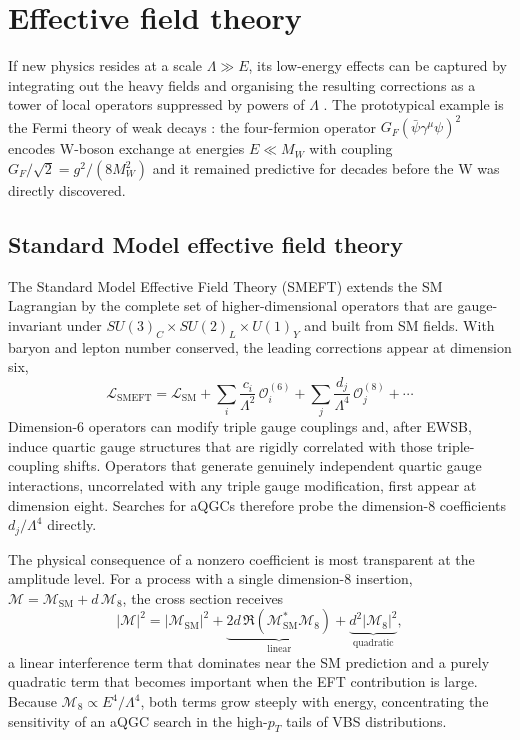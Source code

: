 \section{Effective field theory}

If new physics resides at a scale $\Lambda \gg E$, its low-energy effects can be captured by integrating out the heavy fields and organising the resulting corrections as a tower of local operators suppressed by powers of $\Lambda$ \cite{AppelquistCarazzone_EFT_1975}. The prototypical example is the Fermi theory of weak decays \cite{Fermi_Beta_1933}: the four-fermion operator $G_{F}(\bar{\psi}\gamma^{\mu}\psi)^{2}$ encodes W-boson exchange at energies $E\ll M_W$ with coupling $G_{F}/\sqrt{2}=g^{2}/(8M_{W}^{2})$ and it remained predictive for decades before the W was directly discovered.

\subsection{Standard Model effective field theory}

The Standard Model Effective Field Theory (SMEFT) \cite{BrivioTrott_EFT_2019} extends the SM Lagrangian by the complete set of higher-dimensional operators that are gauge-invariant under $SU(3)_{C}\times SU(2)_{L}\times U(1)_{Y}$ and built from SM fields. With baryon and lepton number conserved, the leading corrections appear at dimension six,
\begin{equation}
\mathcal{L}_{\mathrm{SMEFT}} = \mathcal{L}_{\mathrm{SM}} + \sum_{i}\frac{c_{i}}{\Lambda^{2}}\,\mathcal{O}^{(6)}_{i} + \sum_{j}\frac{d_{j}}{\Lambda^{4}}\,\mathcal{O}^{(8)}_{j} + \cdots
\label{eq:smeft}
\end{equation}
Dimension-6 operators can modify triple gauge couplings and, after EWSB, induce quartic gauge structures that are rigidly correlated with those triple-coupling shifts. Operators that generate genuinely independent quartic gauge interactions, uncorrelated with any triple gauge modification, first appear at dimension eight. Searches for aQGCs therefore probe the dimension-8 coefficients $d_j/\Lambda^4$ directly.

The physical consequence of a nonzero coefficient is most transparent at the amplitude level. For a process with a single dimension-8 insertion, $\mathcal{M}=\mathcal{M}_{\mathrm{SM}}+d\,\mathcal{M}_{8}$, the cross section receives
\begin{equation}
|\mathcal{M}|^{2} = |\mathcal{M}_{\mathrm{SM}}|^{2} + \underbrace{2d\,\Re\!\left(\mathcal{M}_{\mathrm{SM}}^{*}\mathcal{M}_{8}\right)}_{\text{linear}} + \underbrace{d^{2}|\mathcal{M}_{8}|^{2}}_{\text{quadratic}},
\end{equation}
a linear interference term that dominates near the SM prediction and a purely quadratic term that becomes important when the EFT contribution is large. Because $\mathcal{M}_{8}\propto E^{4}/\Lambda^{4}$, both terms grow steeply with energy, concentrating the sensitivity of an aQGC search in the high-$p_{T}$ tails of VBS distributions.

